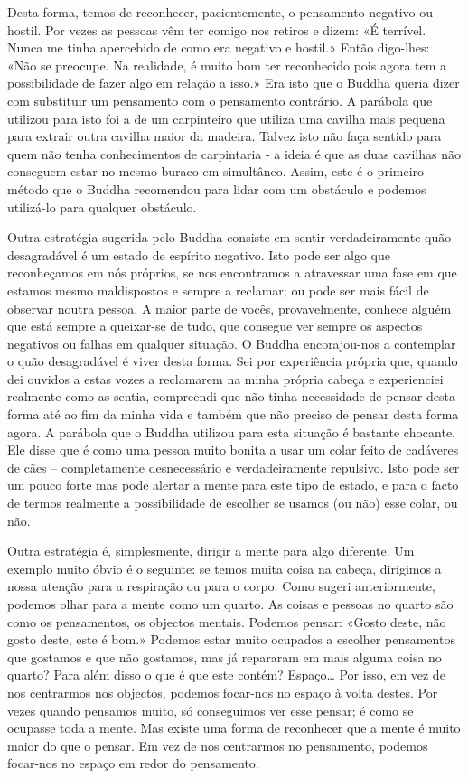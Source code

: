 Desta forma, temos de reconhecer, pacientemente, o pensamento negativo
ou hostil. Por vezes as pessoas vêm ter comigo nos retiros e dizem: «É
terrível. Nunca me tinha apercebido de como era negativo e hostil.»
Então digo-lhes: «Não se preocupe. Na realidade, é muito bom ter
reconhecido pois agora tem a possibilidade de fazer algo em relação a
isso.» Era isto que o Buddha queria dizer com substituir um pensamento
com o pensamento contrário. A parábola que utilizou para isto foi a de
um carpinteiro que utiliza uma cavilha mais pequena para extrair outra
cavilha maior da madeira. Talvez isto não faça sentido para quem não
tenha conhecimentos de carpintaria - a ideia é que as duas cavilhas não
conseguem estar no mesmo buraco em simultâneo. Assim, este é o primeiro
método que o Buddha recomendou para lidar com um obstáculo e podemos
utilizá-lo para qualquer obstáculo.

Outra estratégia sugerida pelo Buddha consiste em sentir verdadeiramente
quão desagradável é um estado de espírito negativo. Isto pode ser algo
que reconheçamos em nós próprios, se nos encontramos a atravessar uma
fase em que estamos mesmo \mbox{maldispostos} e sempre a reclamar; ou pode ser
mais fácil de observar noutra pessoa. A maior parte de vocês,
provavelmente, conhece alguém que está sempre a queixar-se de tudo, que
consegue ver sempre os aspectos negativos ou falhas em qualquer
situação. O Buddha encorajou-nos a contemplar o quão \mbox{desagradável} é
viver desta forma. Sei por experiência própria que, quando dei ouvidos a
estas vozes a reclamarem na minha própria cabeça e experienciei
realmente como as sentia, compreendi que não tinha necessidade de pensar
desta forma até ao fim da minha vida e também que não preciso de pensar
desta forma agora. A parábola que o Buddha utilizou para esta situação é
bastante chocante. Ele disse que é como uma pessoa muito bonita a usar
um colar feito de cadáveres de cães -- completamente desnecessário e
verdadeiramente repulsivo. Isto pode ser um pouco forte mas pode alertar
a mente para este tipo de estado, e para o facto de termos realmente a
possibilidade de escolher se usamos (ou não) esse colar, ou não.

Outra estratégia é, simplesmente, dirigir a mente para algo diferente.
Um exemplo muito óbvio é o seguinte: se temos muita coisa na cabeça,
dirigimos a nossa atenção para a respiração ou para o corpo. Como sugeri
anteriormente, podemos olhar para a mente como um quarto. As coisas e
pessoas no quarto são como os pensamentos, os objectos mentais. Podemos
pensar: «Gosto deste, não gosto deste, este é bom.» Podemos estar muito
ocupados a escolher pensamentos que gostamos e que não gostamos, mas já
repararam em mais alguma coisa no quarto? Para além disso o que é que
este contém? Espaço\ldots{} Por isso, em vez de nos centrarmos nos
objectos, podemos focar-nos no espaço à volta destes. Por vezes quando
pensamos muito, só conseguimos ver esse pensar; é como se ocupasse toda
a mente. Mas existe uma forma de reconhecer que a mente é muito maior do
que o pensar. Em vez de nos centrarmos no pensamento, podemos focar-nos
no espaço em redor do pensamento.

